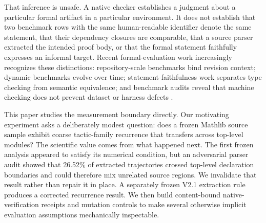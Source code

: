\documentclass[11pt]{article}
\begin{document}
That inference is unsafe. A native checker establishes a judgment about a particular formal artifact in a particular environment. It does not establish that two benchmark rows with the same human-readable identifier denote the same statement, that their dependency closures are comparable, that a source parser extracted the intended proof body, or that the formal statement faithfully expresses an informal target. Recent formal-evaluation work increasingly recognizes these distinctions: repository-scale benchmarks bind revision context; dynamic benchmarks evolve over time; statement-faithfulness work separates type checking from semantic equivalence; and benchmark audits reveal that machine checking does not prevent dataset or harness defects \cite{letson2026sorrydb,firsching2026formalconjectures,xin2026verisoftbench,ammanamanchi2026faults,wu2026itpeval}.

This paper studies the measurement boundary directly. Our motivating experiment asks a deliberately modest question: does a frozen Mathlib source sample exhibit coarse tactic-family recurrence that transfers across top-level modules? The scientific value comes from what happened next. The first frozen analysis appeared to satisfy its numerical condition, but an adversarial parser audit showed that 26.52\% of extracted trajectories crossed top-level declaration boundaries and could therefore mix unrelated source regions. We invalidate that result rather than repair it in place. A separately frozen V2.1 extraction rule produces a corrected recurrence result. We then build content-bound native-verification receipts and mutation controls to make several otherwise implicit evaluation assumptions mechanically inspectable.
\end{document}
